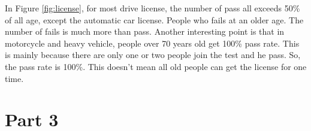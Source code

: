 \documentclass[11pt,a4paper,]{article}
\begin{document}
In Figure \ref{fig:license}, for most drive license, the number of pass all exceeds 50\% of all age, except the automatic car license. People who fails at an older age. The number of fails is much more than pass.
Another interesting point is that in motorcycle and heavy vehicle, people over 70 years old get 100\% pass rate. This is mainly because there are only one or two people join the test and he pass. So, the pass rate is 100\%. This doesn't mean all old people can get the license for one time.

\section*{Part 3}

\printbibliography
\end{document}
